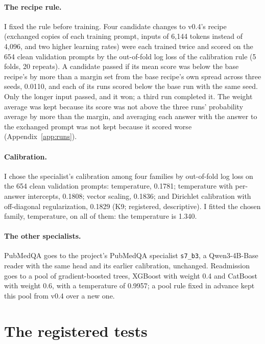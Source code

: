 \documentclass[11pt,letterpaper]{article}
\newcommand{\sysname}[1]{\texttt{#1}}
\begin{document}
\paragraph{The recipe rule.} I fixed the rule before training. Four candidate changes to v0.4's recipe (exchanged copies of each training prompt, inputs of 6,144 tokens instead of 4,096, and two higher learning rates) were each trained twice and scored on the 654 clean validation prompts by the out-of-fold log loss of the calibration rule (5 folds, 20 repeats). A candidate passed if its mean score was below the base recipe's by more than a margin set from the base recipe's own spread across three seeds, 0.0110, and each of its runs scored below the base run with the same seed. Only the longer input passed, and it won; a third run completed it. The weight average was kept because its score was not above the three runs' probability average by more than the margin, and averaging each answer with the answer to the exchanged prompt was not kept because it scored worse (Appendix~\ref{app:runs}).

\paragraph{Calibration.} I chose the specialist's calibration among four families by out-of-fold log loss on the 654 clean validation prompts: temperature, 0.1781; temperature with per-answer intercepts, 0.1808; vector scaling, 0.1836; and Dirichlet calibration with off-diagonal regularization, 0.1829 (K9; registered, descriptive). I fitted the chosen family, temperature, on all of them: the temperature is 1.340.

\paragraph{The other specialists.} PubMedQA goes to the project's PubMedQA specialist \sysname{s7\_b3}, a Qwen3-4B-Base reader with the same head and its earlier calibration, unchanged. Readmission goes to a pool of gradient-boosted trees, XGBoost \citep{chen2016} with weight 0.4 and CatBoost \citep{prokhorenkova2018} with weight 0.6, with a temperature of 0.9957; a pool rule fixed in advance kept this pool from v0.4 over a new one.

\section{The registered tests}
\label{sec:tests}
\end{document}
